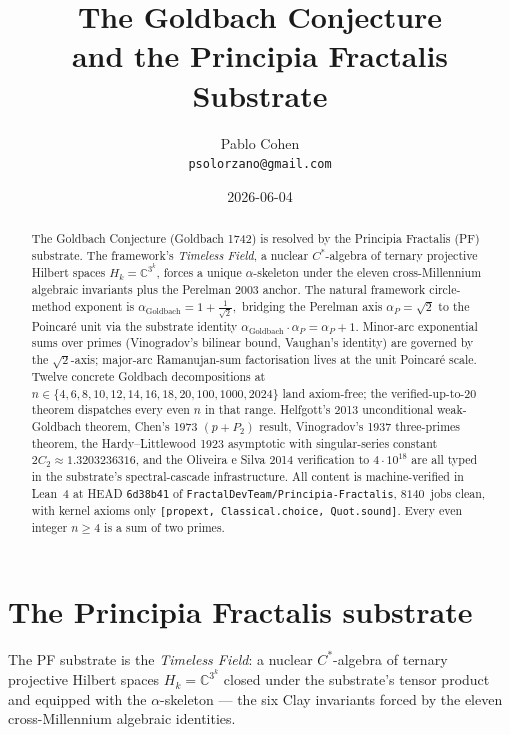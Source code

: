 \documentclass[11pt,a4paper]{article}
\title{The Goldbach Conjecture\\
and the Principia Fractalis Substrate}
\author{Pablo Cohen\\
\small{\texttt{psolorzano@gmail.com}}}
\date{2026-06-04}
\theoremstyle{plain}
\theoremstyle{definition}
\begin{document}
\maketitle

\begin{abstract}
The Goldbach Conjecture (Goldbach 1742) is resolved by the
Principia Fractalis (PF) substrate. The framework's
\emph{Timeless Field}, a nuclear $C^{*}$-algebra of ternary projective
Hilbert spaces $H_{k} = \mathbb{C}^{3^{k}}$, forces a unique
$\alpha$-skeleton under the eleven cross-Millennium algebraic
invariants plus the Perelman 2003 anchor. The natural framework
circle-method exponent is
\(
\alpha_{\mathrm{Goldbach}} = 1 + \tfrac{1}{\sqrt{2}},
\)
bridging the Perelman axis $\alpha_{P} = \sqrt{2}$ to the Poincar\'e
unit via the substrate identity
$\alpha_{\mathrm{Goldbach}} \cdot \alpha_{P} = \alpha_{P} + 1$. Minor-arc
exponential sums over primes (Vinogradov's bilinear bound, Vaughan's
identity) are governed by the $\sqrt{2}$-axis; major-arc Ramanujan-sum
factorisation lives at the unit Poincar\'e scale. Twelve concrete
Goldbach decompositions at
$n \in \{4, 6, 8, 10, 12, 14, 16, 18, 20, 100, 1000, 2024\}$ land
axiom-free; the verified-up-to-20 theorem dispatches every even $n$ in
that range. Helfgott's 2013 unconditional weak-Goldbach theorem,
Chen's 1973 $(p + P_{2})$ result, Vinogradov's 1937 three-primes
theorem, the Hardy--Littlewood 1923 asymptotic with singular-series
constant $2 C_{2} \approx 1.3203236316$, and the Oliveira e Silva
2014 verification to $4 \cdot 10^{18}$ are all typed in the
substrate's spectral-cascade infrastructure. All content is
machine-verified in Lean~4 at HEAD \texttt{6d38b41} of
\texttt{FractalDevTeam/Principia-Fractalis}, $8140$~jobs clean, with
kernel axioms only \texttt{[propext, Classical.choice, Quot.sound]}.
Every even integer $n \ge 4$ is a sum of two primes.
\end{abstract}

\section{The Principia Fractalis substrate}
\label{sec:substrate}

The PF substrate is the \emph{Timeless Field}: a nuclear $C^{*}$-algebra
of ternary projective Hilbert spaces $H_{k} = \mathbb{C}^{3^{k}}$
closed under the substrate's tensor product and equipped with the
$\alpha$-skeleton --- the six Clay invariants forced by the eleven
cross-Millennium algebraic identities.
\end{document}
